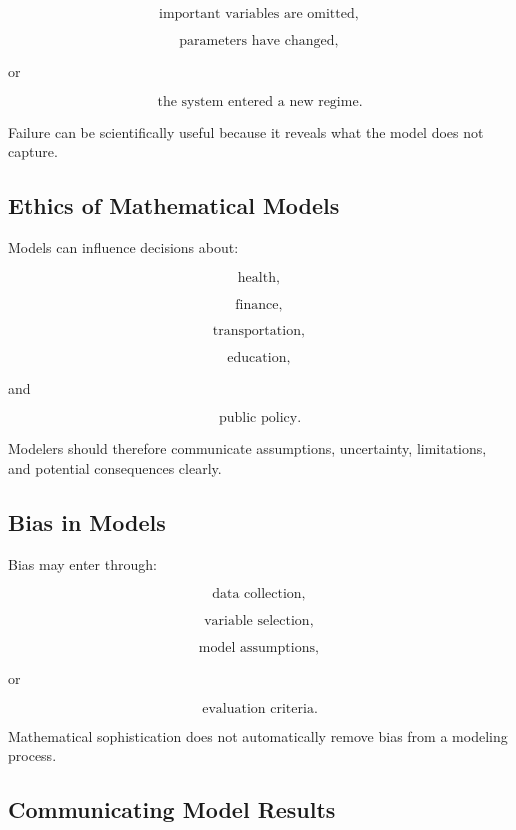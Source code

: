 \[
\boxed{
\text{important variables are omitted},
}
\]

\[
\boxed{
\text{parameters have changed},
}
\]

or

\[
\boxed{
\text{the system entered a new regime}.
}
\]

Failure can be scientifically useful because it reveals what the model
does not capture.

\subsection{Ethics of Mathematical Models}
\label{subsec:modeling-ethics}

Models can influence decisions about:

\[
\boxed{
\text{health},
}
\]

\[
\boxed{
\text{finance},
}
\]

\[
\boxed{
\text{transportation},
}
\]

\[
\boxed{
\text{education},
}
\]

and

\[
\boxed{
\text{public policy}.
}
\]

Modelers should therefore communicate assumptions, uncertainty, limitations,
and potential consequences clearly.

\subsection{Bias in Models}
\label{subsec:model-bias}

Bias may enter through:

\[
\boxed{
\text{data collection},
}
\]

\[
\boxed{
\text{variable selection},
}
\]

\[
\boxed{
\text{model assumptions},
}
\]

or

\[
\boxed{
\text{evaluation criteria}.
}
\]

Mathematical sophistication does not automatically remove bias from a
modeling process.

\subsection{Communicating Model Results}
\label{subsec:communicating-model-results}

